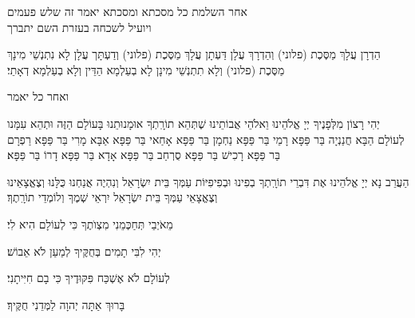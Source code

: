 \clearpage

\thispagestyle{empty}
\centerlastline
\small
\parskip 1pt
{\centering
  \scriptsize
   אחר השלמת כל מסכתא ומסכתא יאמר זה שלש פעמים\\ ויועיל לשכחה בעזרת השם יתברך\hdot
}

הַדְרָן עֲלָךְ מַסֶּכֶת {\scriptsize(פלוני)} וְהַדְרָךְ עֲלָן\hdot
דַּעְתָן עֲלָךְ מַסֶּכֶת {\scriptsize(פלוני)} וְדַעְתָּך עֲלָן\hdot
לָא נִתְנְשֵׁי מִינָךְ מַסֶּכֶת {\scriptsize(פלוני}) וְלָא תִתְנְשֵׁי מִינָן
לָא בְעַלְמָא הַדֵּין וְלָא בְעַלְמָא דְאָתֵי׃

\vspace*{1em}

{\scriptsize ואחר כל יאמר}

יְהִי רָצוֹן מִלְּפָנֶיךָ יְיָ אֱלֹהֵינוּ וֵאלֹהֵי אֲבוֹתֵינוּ שֶׁתְּהֵא תוֹרָֽתְךָ אוּמָנוּתֵנוּ בָּעוֹלָם הַזֶּה וּתְהֵא עִמָּנו לְעוֹלָם הַבָּא\hdot
חֲנַנְיָה בַּר פַּפָּא\hdot
רָמֵי בַּר פַּפָּא\hdot
נַחְמָן בַּר פַּפָּא\hdot
אָחַאי בַּר פַּפָּא\hdot
אַבָּא מָרִי בַּר פַּפָּא\hdot
רַפְרָם בַּר פַּפָּא\hdot
רָכִישׁ בַּר פַּפָּא\hdot
סֻרְחַב בַּר פַּפָּא\hdot
אָדָא בַּר פַּפָּא\hdot
דָרוֹ בַּר פַּפָּא׃

\vspace*{1em}

הַעֲרֵב נָא יְיָ אֱלֹהֵינוּ אֶת דִּבְרֵי תוֹרָֽתְךָ בְפִינוּ וּבְפִיפִיּוֹת עַמְּךָ בֵּית יִשְׂרָאֵל וְנִהְיֶה אֲנַחְנוּ כֻּלָּנוּ וְצֶאֱצָאֵינוּ וְצֶאֱצָאֵי עַמְּךָ בֵּית יִשְׂרָאֵל יִרְאֵי שְׁמֶךָ וְלוֹמְדֵי תוֹרָֽתֶךָ׃

מֵאֹיְבַי תְּחַכְּמֵנִי מִצְוֺתֶךָ כִּי לְעוֹלָם הִיא לִי׃

יְהִי לִבִּי תָמִים בְּחֻקֶּיךָ לְמַעַן לֹא אֵבוֹשׁ׃

לְעוֹלָם לֹא אֶשְׁכַּח פִּקּוּדֶיךָ כִּי בָם חִיִּיתָנִי׃

  בָּרוּךְ אַתָּה יְהוָה לַמְּדֵנִי חֻקֶּיךָ׃

